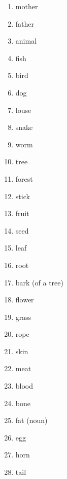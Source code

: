 \begin{multicols}{2}
\begin{enumerate}
\item   mother 

\item   father 

\item   animal 

\item   fish 

\item   bird 

\item   dog 

\item   louse 

\item   snake 

\item   worm 

\item   tree 

\item   forest 

\item   stick 

\item   fruit 

\item   seed 

\item   leaf 

\item   root 

\item   bark (of a tree) 

\item   flower 

\item   grass 

\item   rope 

\item   skin 

\item   meat 

\item   blood 

\item   bone 

\item   fat (noun) 

\item   egg 

\item   horn 

\item   tail 


\end{enumerate}
\end{multicols}
